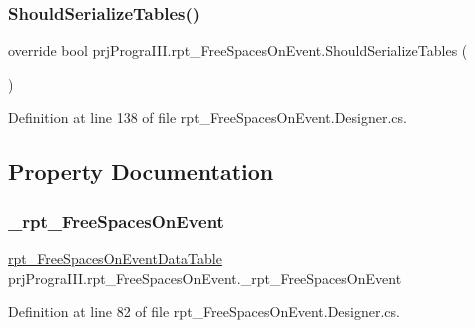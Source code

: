 \subsubsection{\texorpdfstring{Should\+Serialize\+Tables()}{ShouldSerializeTables()}}
{\footnotesize\ttfamily override bool prj\+Progra\+I\+I\+I.\+rpt\+\_\+\+Free\+Spaces\+On\+Event.\+Should\+Serialize\+Tables (\begin{DoxyParamCaption}{ }\end{DoxyParamCaption})\hspace{0.3cm}{\ttfamily [protected]}}



Definition at line 138 of file rpt\+\_\+\+Free\+Spaces\+On\+Event.\+Designer.\+cs.



\subsection{Property Documentation}
\hypertarget{classprj_progra_i_i_i_1_1rpt___free_spaces_on_event_aa03f5088806705e6254de84ae5ff0f0e}{}\label{classprj_progra_i_i_i_1_1rpt___free_spaces_on_event_aa03f5088806705e6254de84ae5ff0f0e} 
\subsubsection{\texorpdfstring{\+\_\+rpt\+\_\+\+Free\+Spaces\+On\+Event}{\_rpt\_FreeSpacesOnEvent}}
{\footnotesize\ttfamily \hyperlink{classprj_progra_i_i_i_1_1rpt___free_spaces_on_event_1_1rpt___free_spaces_on_event_data_table}{rpt\+\_\+\+Free\+Spaces\+On\+Event\+Data\+Table} prj\+Progra\+I\+I\+I.\+rpt\+\_\+\+Free\+Spaces\+On\+Event.\+\_\+rpt\+\_\+\+Free\+Spaces\+On\+Event\hspace{0.3cm}{\ttfamily [get]}}



Definition at line 82 of file rpt\+\_\+\+Free\+Spaces\+On\+Event.\+Designer.\+cs.

\hypertarget{classprj_progra_i_i_i_1_1rpt___free_spaces_on_event_a3ddc8e70e30d172babf1e9191a083786}{}\label{classprj_progra_i_i_i_1_1rpt___free_spaces_on_event_a3ddc8e70e30d172babf1e9191a083786} 
